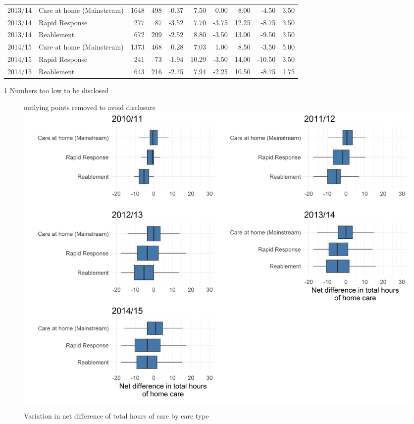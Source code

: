 \documentclass[]{article}
\begin{document}
\begin{table}[h]
{\begin{threeparttable}
\begin{tabular}{@{}llrrrrrrrr@{}}
2013/14 & Care at home (Mainstream) & 1648 & 498 & -0.37 & 7.50 & 0.00 & 8.00 & -4.50 & 3.50 \\
2013/14 & Rapid Response & 277 & 87 & -3.52 & 7.70 & -3.75 & 12.25 & -8.75 & 3.50 \\
2013/14 & Reablement & 672 & 209 & -2.52 & 8.80 & -3.50 & 13.00 & -9.50 & 3.50 \\
2014/15 & Care at home (Mainstream) & 1373 & 468 & 0.28 & 7.03 & 1.00 & 8.50 & -3.50 & 5.00 \\
2014/15 & Rapid Response & 241 & 73 & -1.94 & 10.29 & -3.50 & 14.00 & -10.50 & 3.50 \\
2014/15 & Reablement & 643 & 216 & -2.75 & 7.94 & -2.25 & 10.50 & -8.75 & 1.75 \\ \bottomrule
\end{tabular}
\begin{tablenotes}
\item[1] Numbers too low to be disclosed
\end{tablenotes}
\end{threeparttable}%
}
\end{table}

\begin{figure}[]
  \centering
    \caption{Variation in net difference of total hours of care by care type}
    {\scriptsize outlying points removed to avoid disclosure}
    \includegraphics[]{figures/chapter-renf/10-net-diff-plot.png}
    \label{fig:renf-net-diff}
\end{figure}
\end{document}
